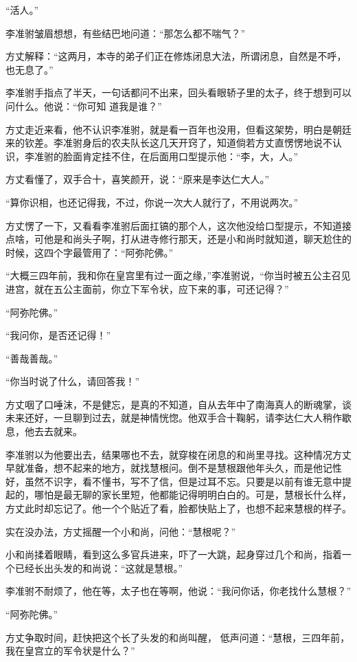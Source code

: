 “活人。”

李准驸皱眉想想，有些结巴地问道：“那怎么都不喘气？”

方丈解释：“这两月，本寺的弟子们正在修炼闭息大法，所谓闭息，自然是不呼，也无息了。”

李准驸手指点了半天，一句话都问不出来，回头看眼轿子里的太子，终于想到可以问什么。他说：“你可知
道我是谁？”

方丈走近来看，他不认识李准驸，就是看一百年也没用，但看这架势，明白是朝廷来的钦差。李准驸身后的农夫队长这几天开窍了，知道倘若方丈直愣愣地说不认识，李准驸的脸面肯定挂不住，在后面用口型提示他：“李，大，人。”

方丈看懂了，双手合十，喜笑颜开，说：“原来是李达仁大人。”

“算你识相，也还记得我，不过，你说一次大人就行了，不用说两次。”

方丈愣了一下，又看看李准驸后面扛镐的那个人，这次他没给口型提示，不知道接点啥，可他是和尚头子啊，打从进寺修行那天，还是小和尚时就知道，聊天尬住的时候，这四个字最管用了：“阿弥陀佛。”

“大概三四年前，我和你在皇宫里有过一面之缘，”李准驸说，“你当时被五公主召见进宫，就在五公主面前，你立下军令状，应下来的事，可还记得？”

“阿弥陀佛。”

“我问你，是否还记得！”

“善哉善哉。”

“你当时说了什么，请回答我！”

方丈咽了口唾沫，不是健忘，是真的不知道，自从去年中了南海真人的断魂掌，谈未来还好，一旦聊到过去，就是神情恍惚。他双手合十鞠躬，请李达仁大人稍作歇息，他去去就来。

李准驸以为他要出去，结果哪也不去，就穿梭在闭息的和尚里寻找。这种情况方丈早就准备，想不起来的地方，就找慧根问。倒不是慧根跟他年头久，而是他记性好，虽然不识字，看不懂书，写不了信，但是过耳不忘。只要是以前有谁无意中提起的，哪怕是最无聊的家长里短，他都能记得明明白白的。可是，慧根长什么样，方丈此时却忘记了。他一个个贴近了看，脸都快贴上了，也想不起来慧根的样子。

实在没办法，方丈摇醒一个小和尚，问他：“慧根呢？”

小和尚揉着眼睛，看到这么多官兵进来，吓了一大跳，起身穿过几个和尚，指着一个已经长出头发的和尚说：“这就是慧根。”

李准驸不耐烦了，他在等，太子也在等啊，他说：“我问你话，你老找什么慧根？”

“阿弥陀佛。”

方丈争取时间，赶快把这个长了头发的和尚叫醒，
低声问道：“慧根，三四年前，我在皇宫立的军令状是什么？”

